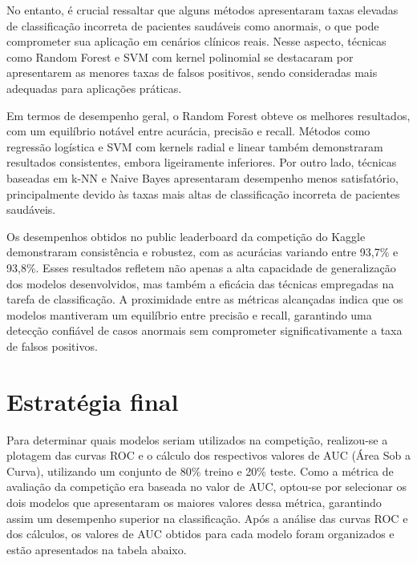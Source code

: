 \documentclass[10pt, conference, compsocconf]{IEEEtran}
\begin{document}
No entanto, é crucial ressaltar que alguns métodos apresentaram taxas elevadas de classificação incorreta de pacientes saudáveis como anormais, o que pode comprometer sua aplicação em cenários clínicos reais. Nesse aspecto, técnicas como Random Forest e SVM com kernel polinomial se destacaram por apresentarem as menores taxas de falsos positivos, sendo consideradas mais adequadas para aplicações práticas.

Em termos de desempenho geral, o Random Forest obteve os melhores resultados, com um equilíbrio notável entre acurácia, precisão e recall. Métodos como regressão logística e SVM com kernels radial e linear também demonstraram resultados consistentes, embora ligeiramente inferiores. Por outro lado, técnicas baseadas em k-NN e Naive Bayes apresentaram desempenho menos satisfatório, principalmente devido às taxas mais altas de classificação incorreta de pacientes saudáveis.


Os desempenhos obtidos no public leaderboard da competição do Kaggle demonstraram consistência e robustez, com as acurácias variando entre 93,7\% 
e 93,8\%. Esses resultados refletem não apenas a alta capacidade de generalização dos modelos desenvolvidos, mas também a eficácia das técnicas 
empregadas na tarefa de classificação. A proximidade entre as métricas alcançadas indica que os modelos mantiveram um equilíbrio entre precisão e recall, 
garantindo uma detecção confiável de casos anormais sem comprometer significativamente a taxa de falsos positivos.


\section{Estratégia final}


Para determinar quais modelos seriam utilizados na competição, realizou-se a plotagem das curvas ROC e o cálculo dos respectivos valores de AUC 
(Área Sob a Curva), utilizando um conjunto de 80\% treino e 20\% teste. Como a métrica de avaliação da competição era baseada no valor de AUC, optou-se por selecionar os dois modelos que apresentaram os 
maiores valores dessa métrica, garantindo assim um desempenho superior na classificação. Após a análise das curvas ROC e dos cálculos, os valores de AUC 
obtidos para cada modelo foram organizados e estão apresentados na tabela abaixo. 
\end{document}
